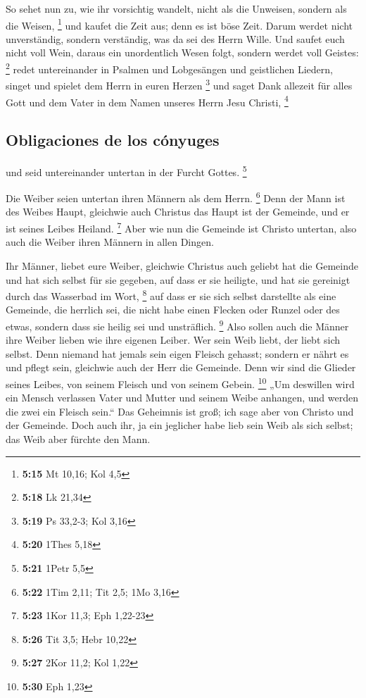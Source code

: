  So sehet nun zu, wie ihr vorsichtig wandelt, nicht als
die Unweisen, sondern als die Weisen, \footnote{\textbf{5:15} Mt 10,16;
  Kol 4,5}  und kaufet die Zeit aus; denn es ist böse
Zeit.  Darum werdet nicht unverständig, sondern
verständig, was da sei des Herrn Wille.  Und saufet euch
nicht voll Wein, daraus ein unordentlich Wesen folgt, sondern werdet
voll Geistes: \footnote{\textbf{5:18} Lk 21,34}  redet
untereinander in Psalmen und Lobgesängen und geistlichen Liedern, singet
und spielet dem Herrn in euren Herzen \footnote{\textbf{5:19} Ps 33,2-3;
  Kol 3,16}  und saget Dank allezeit für alles Gott und
dem Vater in dem Namen unseres Herrn Jesu Christi, \footnote{\textbf{5:20}
  1Thes 5,18}

\hypertarget{obligaciones-de-los-cuxf3nyuges}{%
\subsection{Obligaciones de los
cónyuges}\label{obligaciones-de-los-cuxf3nyuges}}

 und seid untereinander untertan in der Furcht Gottes.
\footnote{\textbf{5:21} 1Petr 5,5}

 Die Weiber seien untertan ihren Männern als dem Herrn.
\footnote{\textbf{5:22} 1Tim 2,11; Tit 2,5; 1Mo 3,16} 
Denn der Mann ist des Weibes Haupt, gleichwie auch Christus das Haupt
ist der Gemeinde, und er ist seines Leibes Heiland. \footnote{\textbf{5:23}
  1Kor 11,3; Eph 1,22-23}  Aber wie nun die Gemeinde ist
Christo untertan, also auch die Weiber ihren Männern in allen Dingen.

 Ihr Männer, liebet eure Weiber, gleichwie Christus auch
geliebt hat die Gemeinde und hat sich selbst für sie gegeben,
 auf dass er sie heiligte, und hat sie gereinigt durch
das Wasserbad im Wort, \footnote{\textbf{5:26} Tit 3,5; Hebr 10,22}
 auf dass er sie sich selbst darstellte als eine
Gemeinde, die herrlich sei, die nicht habe einen Flecken oder Runzel
oder des etwas, sondern dass sie heilig sei und unsträflich. \footnote{\textbf{5:27}
  2Kor 11,2; Kol 1,22}  Also sollen auch die Männer ihre
Weiber lieben wie ihre eigenen Leiber. Wer sein Weib liebt, der liebt
sich selbst.  Denn niemand hat jemals sein eigen Fleisch
gehasst; sondern er nährt es und pflegt sein, gleichwie auch der Herr
die Gemeinde.  Denn wir sind die Glieder seines Leibes,
von seinem Fleisch und von seinem Gebein. \footnote{\textbf{5:30} Eph
  1,23}  „Um deswillen wird ein Mensch verlassen Vater
und Mutter und seinem Weibe anhangen, und werden die zwei ein Fleisch
sein.``  Das Geheimnis ist groß; ich sage aber von
Christo und der Gemeinde.  Doch auch ihr, ja ein
jeglicher habe lieb sein Weib als sich selbst; das Weib aber fürchte den
Mann.

